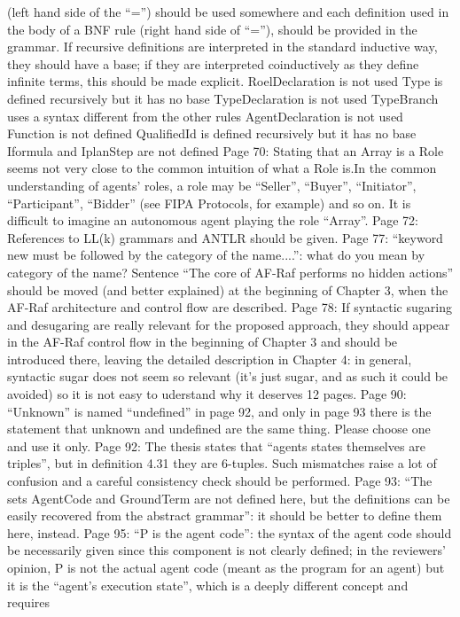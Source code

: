\documentclass{article}
\begin{document}
(left hand side of the “=”) should be used somewhere and each definition used in the body of a BNF
rule (right hand side of “=”), should be provided in the grammar. If recursive definitions are
interpreted in the standard inductive way, they should have a base; if they are interpreted
coinductively as they define infinite terms, this should be made explicit.
RoelDeclaration is not used
Type is defined recursively but it has no base
TypeDeclaration is not used
TypeBranch uses a syntax different from the other rules
AgentDeclaration is not used
Function is not defined
QualifiedId is defined recursively but it has no base
Iformula and IplanStep are not defined
Page 70:
Stating that an Array is a Role seems not very close to the common intuition of what a Role is.In the
common understanding of agents' roles, a role may be “Seller”, “Buyer”, “Initiator”, “Participant”,
“Bidder” (see FIPA Protocols, for example) and so on. It is difficult to imagine an autonomous agent
playing the role “Array”.
Page 72:
References to LL(k) grammars and ANTLR should be given.
Page 77:
“keyword new must be followed by the category of the name....”: what do you mean by category of
the name?
Sentence “The core of AF-Raf performs no hidden actions” should be moved (and better explained)
at the beginning of Chapter 3, when the AF-Raf architecture and control flow are described.
Page 78:
If syntactic sugaring and desugaring are really relevant for the proposed approach, they should
appear in the AF-Raf control flow in the beginning of Chapter 3 and should be introduced there,
leaving the detailed description in Chapter 4: in general, syntactic sugar does not seem so relevant
(it's just sugar, and as such it could be avoided) so it is not easy to uderstand why it deserves 12
pages.
Page 90:
“Unknown” is named “undefined” in page 92, and only in page 93 there is the statement that
unknown and undefined are the same thing. Please choose one and use it only.
Page 92:
The thesis states that “agents states themselves are triples”, but in definition 4.31 they are 6-tuples.
Such mismatches raise a lot of confusion and a careful consistency check should be performed.
Page 93:
“The sets AgentCode and GroundTerm are not defined here, but the definitions can be easily
recovered from the abstract grammar”: it should be better to define them here, instead.
Page 95:
“P is the agent code”: the syntax of the agent code should be necessarily given since this component
is not clearly defined; in the reviewers' opinion, P is not the actual agent code (meant as the program
for an agent) but it is the “agent's execution state”, which is a deeply different concept and requires
\end{document}
